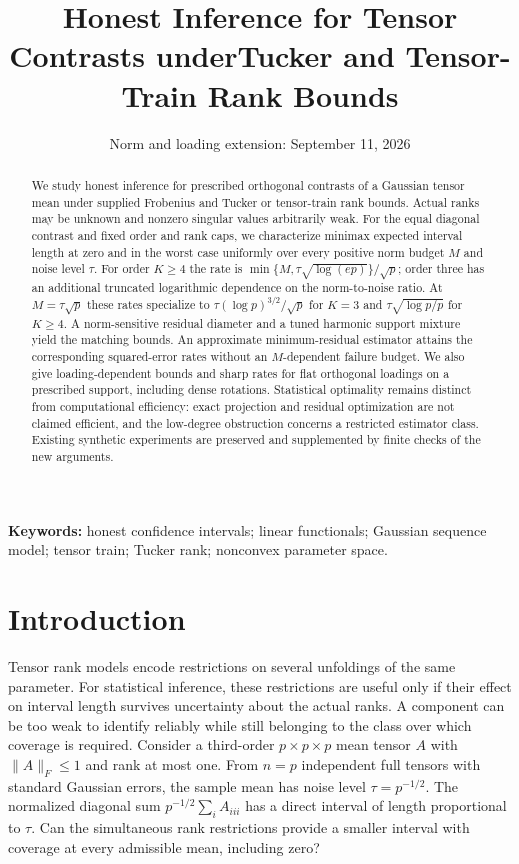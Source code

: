 \documentclass[11pt]{article}
\title{Honest Inference for Tensor Contrasts under\newline Tucker and Tensor-Train Rank Bounds}
\author{}
\date{Norm and loading extension: September 11, 2026}
\theoremstyle{remark}
\newcommand{\norm}[1]{\lVert #1\rVert}
\begin{document}
\maketitle

\begin{abstract}
We study honest inference for prescribed orthogonal contrasts of a Gaussian tensor mean under supplied Frobenius and Tucker or tensor-train rank bounds. Actual ranks may be unknown and nonzero singular values arbitrarily weak. For the equal diagonal contrast and fixed order and rank caps, we characterize minimax expected interval length at zero and in the worst case uniformly over every positive norm budget $M$ and noise level $\tau$. For order $K\ge4$ the rate is $\min\{M,\tau\sqrt{\log(ep)}\}/\sqrt p$; order three has an additional truncated logarithmic dependence on the norm-to-noise ratio. At $M=\tau\sqrt p$ these rates specialize to $\tau(\log p)^{3/2}/\sqrt p$ for $K=3$ and $\tau\sqrt{\log p/p}$ for $K\ge4$. A norm-sensitive residual diameter and a tuned harmonic support mixture yield the matching bounds. An approximate minimum-residual estimator attains the corresponding squared-error rates without an $M$-dependent failure budget. We also give loading-dependent bounds and sharp rates for flat orthogonal loadings on a prescribed support, including dense rotations. Statistical optimality remains distinct from computational efficiency: exact projection and residual optimization are not claimed efficient, and the low-degree obstruction concerns a restricted estimator class. Existing synthetic experiments are preserved and supplemented by finite checks of the new arguments.
\end{abstract}

\noindent\textbf{Keywords:} honest confidence intervals; linear functionals; Gaussian sequence model; tensor train; Tucker rank; nonconvex parameter space.

\section{Introduction}\label{sec:intro}

Tensor rank models encode restrictions on several unfoldings of the same parameter. For statistical inference, these restrictions are useful only if their effect on interval length survives uncertainty about the actual ranks. A component can be too weak to identify reliably while still belonging to the class over which coverage is required. Consider a third-order $p\times p\times p$ mean tensor $A$ with $\norm A_F\le1$ and rank at most one. From $n=p$ independent full tensors with standard Gaussian errors, the sample mean has noise level $\tau=p^{-1/2}$. The normalized diagonal sum $p^{-1/2}\sum_i A_{iii}$ has a direct interval of length proportional to $\tau$. Can the simultaneous rank restrictions provide a smaller interval with coverage at every admissible mean, including zero?
\end{document}
